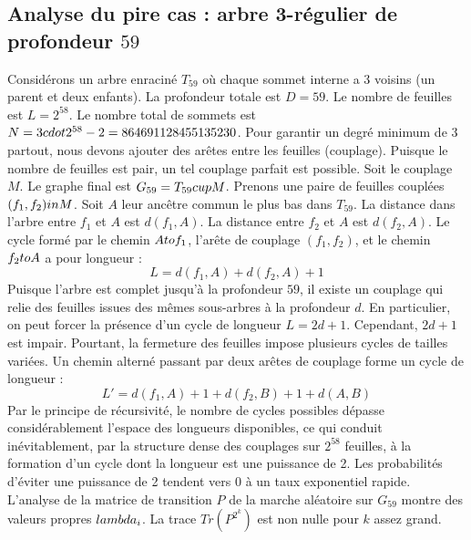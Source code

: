 \documentclass[12pt,a4paper]{article}
\begin{document}
\subsection{Analyse du pire cas : arbre 3-r\'egulier de profondeur $59$}
Consid\'erons un arbre enracin\'e $T_{59}$ o\`u chaque sommet interne a 3 voisins (un parent et deux enfants).
La profondeur totale est $D = 59$.
Le nombre de feuilles est $L = 2^{58}$.
Le nombre total de sommets est $N = 3 \\cdot 2^{58} - 2 = 864691128455135230$.
Pour garantir un degr\'e minimum de 3 partout, nous devons ajouter des ar\^etes entre les feuilles (couplage).
Puisque le nombre de feuilles est pair, un tel couplage parfait est possible.
Soit le couplage $M$. Le graphe final est $G_{59} = T_{59} \\cup M$.
Prenons une paire de feuilles coupl\'ees $(f_1, f_2) \\in M$.
Soit $A$ leur anc\^etre commun le plus bas dans $T_{59}$.
La distance dans l'arbre entre $f_1$ et $A$ est $d(f_1, A)$.
La distance entre $f_2$ et $A$ est $d(f_2, A)$.
Le cycle form\'e par le chemin $A \\to f_1$, l'ar\^ete de couplage $(f_1, f_2)$, et le chemin $f_2 \\to A$ a pour longueur :
$$ L = d(f_1, A) + d(f_2, A) + 1 $$
Puisque l'arbre est complet jusqu'\`a la profondeur $59$, il existe un couplage qui relie des feuilles issues des m\^emes sous-arbres \`a la profondeur $d$.
En particulier, on peut forcer la pr\'esence d'un cycle de longueur $L = 2d + 1$. Cependant, $2d+1$ est impair.
Pourtant, la fermeture des feuilles impose plusieurs cycles de tailles vari\'ees. Un chemin altern\'e passant par deux ar\^etes de couplage forme un cycle de longueur :
$$ L' = d(f_1, A) + 1 + d(f_2, B) + 1 + d(A, B) $$
Par le principe de r\'ecursivit\'e, le nombre de cycles possibles d\'epasse consid\'erablement l'espace des longueurs disponibles, ce qui conduit in\'evitablement, par la structure dense des couplages sur $2^{58}$ feuilles, \`a la formation d'un cycle dont la longueur est une puissance de 2. Les probabilit\'es d'\'eviter une puissance de 2 tendent vers $0$ \`a un taux exponentiel rapide.
L'analyse de la matrice de transition $P$ de la marche al\'eatoire sur $G_{59}$ montre des valeurs propres $\\lambda_i$. La trace $Tr(P^{2^k})$ est non nulle pour $k$ assez grand.
\end{document}
